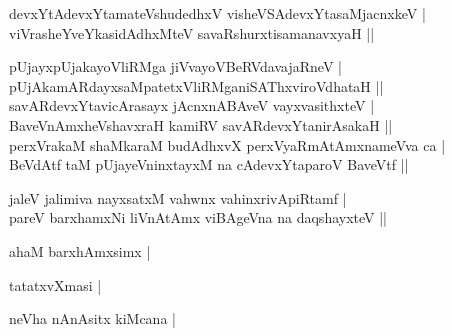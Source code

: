 \begin{entry}
\smallskip
\begin{shl}
devxYtAdevxYtamateVshudedhxV visheVSAdevxYtasaMjacnxkeV |\\
viVrasheYveYkasidAdhxMteV savaRshurxtisamanavxyaH ||
\end{shl}
\medskip
{}
\smallskip
\begin{shl}
pUjayxpUjakayoVliRMga jiVvayoVBeRVdavajaRneV |\\
pUjAkamARdayxsaMpatetxVliRMganiSAThxviroVdhataH ||\\
savARdevxYtavicArasayx jAcnxnABAveV vayxvasithxteV |\\
BaveVnAmxheVshavxraH kamiRV savARdevxYtanirAsakaH ||\\
perxVrakaM shaMkaraM budAdhxvX perxVyaRmAtAmxnameVva ca |\\
BeVdAtf taM pUjayeVninxtayxM na cAdevxYtaparoV BaveVtf ||
\end{shl}
\medskip
{}
\smallskip
\begin{shl}
jaleV jalimiva nayxsatxM vahwnx vahinxrivApiRtamf |\\
pareV barxhamxNi liVnAtAmx viBAgeVna na daqshayxteV ||
\end{shl}
\medskip
{}
\smallskip
\begin{shl}
ahaM barxhAmxsimx |
\end{shl}
\medskip
{}
\smallskip
\begin{shl}
tatatxvXmasi |
\end{shl}
\medskip
{}
\smallskip
\begin{shl}
neVha nAnAsitx kiMcana |
\end{shl}
\medskip
{}
\end{entry}

\begin{entry}
\end{entry}

